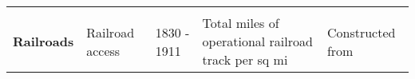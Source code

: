 \begin{tabular}{@{}l|llll@{}}
                                   &                                                             &                                    &             &                                                                                                                                                                                                   \\       
\textbf{Railroads} 	 & Railroad  access                                           & 1830 - 1911                         &  Total miles of operational railroad track per sq mi     &  Constructed from \cite{atack2013use}      \\
  \hline\hline                                                                                                                               
\end{tabular}